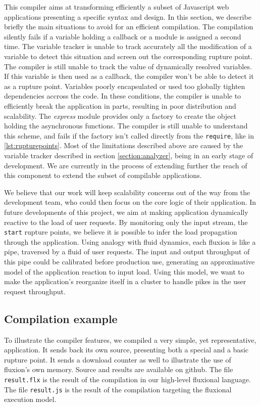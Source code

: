 This compiler aims at transforming efficiently a subset of Javascript web applications presenting a specific syntax and design.
In this section, we describe briefly the main situations to avoid for an efficient compilation.
The compilation silently fails if a variable holding a callback or a module is assigned a second time.
The variable tracker is unable to track accurately all the modification of a variable to detect this situation and screen out the corresponding rupture point.
The compiler is still unable to track the value of dynamically resolved variables.
If this variable is then used as a callback, the compiler won't be able to detect it as a rupture point.
Variables poorly encapsulated or used too globally tighten dependencies accross the code.
In these conditions, the compiler is unable to efficiently break the application in parts, resulting in poor distribution and scalability.
The \textit{express} module provides only a factory to create the object holding the asynchronous functions.
The compiler is still unable to understand this scheme, and fails if the factory isn't called directly from the \texttt{require}, like in \ref{lst:rupturepoints}.
Most of the limitations described above are caused by the variable tracker described in section \ref{section:analyzer}, being in an early stage of development.
We are currently in the process of extending further the reach of this component to extend the subset of compilable applications.

We believe that our work will keep scalability concerns out of the way from the development team, who could then focus on the core logic of their application.
In future developments of this project, we aim at making application dynamically reactive to the load of user requests.
By monitoring only the input stream, the \texttt{start} rupture points, we believe it is possible to infer the load propagation through the application.
Using analogy with fluid dynamics, each fluxion is like a pipe, traversed by a fluid of user requests.
The input and output throughput of this pipe could be calibrated before production use, generating an approximative model of the application reaction to input load.
Using this model, we want to make the application's reorganize itself in a cluster to handle pikes in the user request throughput.

\subsection{Compilation example}

To illustrate the compiler features, we compiled a very simple, yet representative, application.
It sends back its own source, presenting both a special and a basic rupture point.
It sends a download counter as well to illustrate the use of fluxion's own memory.
Source and results are available on github\cite{flx-example}.
The file \texttt{result.flx} is the result of the compilation in our high-level fluxional language.
The file \texttt{result.js} is the result of the compilation targeting the fluxional execution model.
